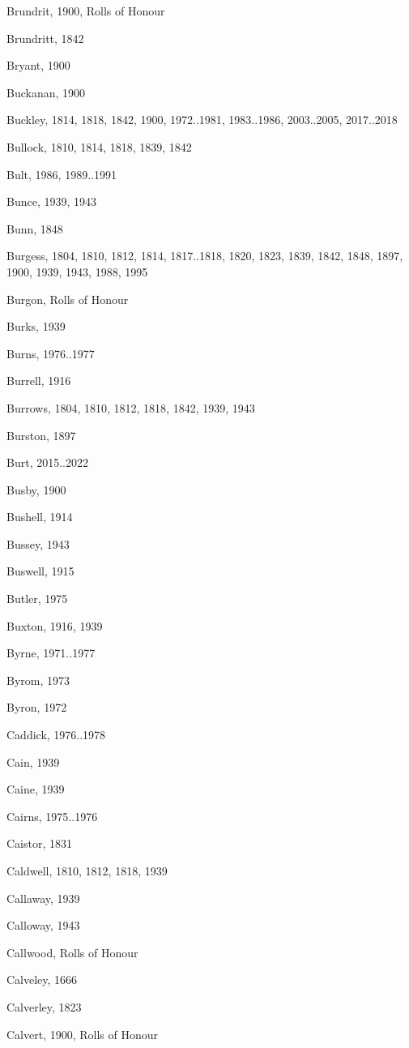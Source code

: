 \begin{theindex}
\item Brundrit, 1900, Rolls of Honour
\item Brundritt, 1842
\item Bryant, 1900
\item Buckanan, 1900
\item Buckley, 1814, 1818, 1842, 1900, 1972..1981, 1983..1986, 2003..2005, 2017..2018
\item Bullock, 1810, 1814, 1818, 1839, 1842
\item Bult, 1986, 1989..1991
\item Bunce, 1939, 1943
\item Bunn, 1848
\item Burgess, 1804, 1810, 1812, 1814, 1817..1818, 1820, 1823, 1839, 1842, 1848, 1897, 1900, 1939, 1943, 1988, 1995
\item Burgon, Rolls of Honour
\item Burks, 1939
\item Burns, 1976..1977
\item Burrell, 1916
\item Burrows, 1804, 1810, 1812, 1818, 1842, 1939, 1943
\item Burston, 1897
\item Burt, 2015..2022
\item Busby, 1900
\item Bushell, 1914
\item Bussey, 1943
\item Buswell, 1915
\item Butler, 1975
\item Buxton, 1916, 1939
\item Byrne, 1971..1977
\item Byrom, 1973
\item Byron, 1972
\item Caddick, 1976..1978
\item Cain, 1939
\item Caine, 1939
\item Cairns, 1975..1976
\item Caistor, 1831
\item Caldwell, 1810, 1812, 1818, 1939
\item Callaway, 1939
\item Calloway, 1943
\item Callwood, Rolls of Honour
\item Calveley, 1666
\item Calverley, 1823
\item Calvert, 1900, Rolls of Honour

\end{theindex}
